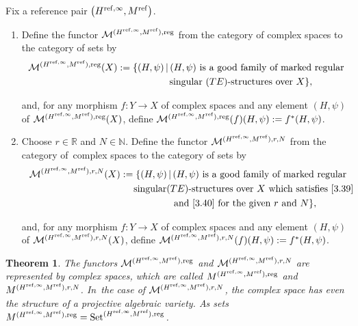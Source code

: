 \documentclass[10pt,a4paper]{amsart}
\numberwithin{equation}{section}
\numberwithin{figure}{section}
\newcommand{\N}{{\mathbb N}}
\newcommand{\R}{{\mathbb R}}
\newcommand{\MM}{{\mathcal M}}
\newtheorem{Theorem}{Theorem}[section]
\begin{document}
\begin{Definition}\label{t3.28}
Fix a reference pair $\big(H^{{\rm ref},\infty},M^{\rm ref}\big)$.
\begin{enumerate}\itemsep=0pt
\item[$(a)$] Define the functor $\MM^{(H^{{\rm ref},\infty},M^{\rm ref}),{\rm reg}}$
from the category of complex spaces to the category of sets by
\begin{gather*}%
\MM^{(H^{{\rm ref},\infty},M^{\rm ref}),{\rm reg}}(X)
:= \{(H,\psi)\,|\, (H,\psi) \text{ is a good family of marked regular}
\\ \hphantom{\MM^{(H^{{\rm ref},\infty},M^{\rm ref}),{\rm reg}}(X):= \{}
\text{singular }(TE)\text{-structures over }X\},
\end{gather*}
{\sloppy
and, for any morphism $f\colon Y\to X$ of complex spaces and any element
$(H,\psi)$ of $\MM^{(H^{{\rm ref},\infty},M^{\rm ref}),{\rm reg}}(X)$, define
$\MM^{(H^{{\rm ref},\infty},M^{\rm ref}),{\rm reg}}(f)(H,\psi):=f^*(H,\psi)$.

}

\item[$(b)$] Choose $r\in\R$ and $N\in \N$.
Define the functor $\MM^{(H^{{\rm ref},\infty},M^{\rm ref}),r,N}$
from the category of~comp\-lex spaces to the category of sets by
\begin{gather*}%
\MM^{(H^{{\rm ref},\infty},M^{\rm ref}),r,N}(X)
:=\{(H,\psi)\,|\, (H,\psi) \text{ is a good family of marked regular }
\\ \hphantom{\MM^{(H^{{\rm ref},\infty},M^{\rm ref}),r,N}(X):=\{}
\text{singular} (TE)\text{-structures over }X
\text{ which satisfies~\eqref{3.39} }
\\ \hphantom{\MM^{(H^{{\rm ref},\infty},M^{\rm ref}),r,N}(X):=\{}
\text{and~\eqref{3.40} for the given }r\text{ and }N\},
\end{gather*}
{\sloppy
and, for any morphism $f\colon Y\to X$ of complex spaces and any element
$(H,\psi)$ of $\MM^{(H^{{\rm ref},\infty},M^{\rm ref}),r,N}(X)$, define
$\MM^{(H^{{\rm ref},\infty},M^{\rm ref}),r,N}(f)(H,\psi):=f^*(H,\psi)$.

}
\end{enumerate}
\end{Definition}


{\sloppy\begin{Theorem}\label{t3.29}
The functors $\MM^{(H^{{\rm ref},\infty},M^{\rm ref}),{\rm reg}}$ and
$\MM^{(H^{{\rm ref},\infty},M^{\rm ref}),r,N}$ are represented by
complex spaces, which are called
$M^{(H^{{\rm ref},\infty},M^{\rm ref}),{\rm reg}}$ and
$M^{(H^{{\rm ref},\infty},M^{\rm ref}),r,N}$. In~the case of $\MM^{(H^{{\rm ref},\infty},M^{\rm ref}),r,N}$, the complex space
has even the structure of a projective algebraic variety.
As sets $M^{(H^{{\rm ref},\infty},M^{\rm ref}),{\rm reg}}
={\rm Set}^{(H^{{\rm ref},\infty},M^{\rm ref}),{\rm reg}}$.
\end{Theorem}

}
\end{document}

